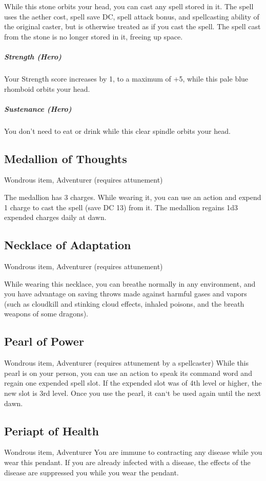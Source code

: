 While this stone orbits your head, you can cast any spell stored in it. The spell uses the aether cost, spell save DC, spell attack bonus, and spellcasting ability of the original caster, but is otherwise treated as if you cast the spell. The spell cast from the stone is no longer stored in it, freeing up space.

\subparagraph*{Strength (Hero)} Your Strength score increases by 1, to a maximum of +5, while this pale blue rhomboid orbits your head.

\subparagraph*{Sustenance (Hero)} You don't need to eat or drink while this clear spindle orbits your head.

\subsection{Medallion of Thoughts}
Wondrous item, Adventurer (requires attunement)

The medallion has 3 charges. While wearing it, you can use an action and expend 1 charge to cast the  spell (save DC 13) from it. The medallion regains 1d3 expended charges daily at dawn.

\subsection{Necklace of Adaptation}
Wondrous item, Adventurer (requires attunement) 

While wearing this necklace, you can breathe normally in any environment, and you have advantage on saving throws made against harmful gases and vapors (such as cloudkill and stinking cloud effects, inhaled poisons, and the breath weapons of some dragons).

\subsection{Pearl of Power}
Wondrous item, Adventurer (requires attunement by a spellcaster) While this pearl is on your person, you can use an action to speak its command word and regain one expended spell slot. If the expended slot was of 4th level or higher, the new slot is 3rd level. Once you use the pearl, it can`t be used again until the next dawn.

\subsection{Periapt of Health}
Wondrous item, Adventurer You are immune to contracting any disease while you wear this pendant. If you are already infected with a disease, the effects of the disease are suppressed you while you wear the pendant.

